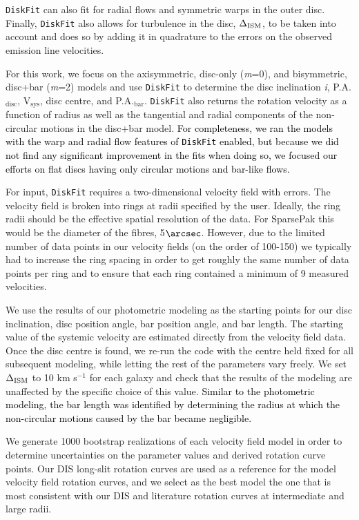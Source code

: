 \documentclass[a4paper,fleqn,usenatbib]{mnras}
\newcommand{\authorfix}{\textcolor{black}}
\begin{document}
\texttt{DiskFit} can also fit for radial flows and symmetric warps in the outer disc. Finally, \texttt{DiskFit} also allows for turbulence in the disc, $\Delta_{\rm ISM}$, to be taken into account and does so by adding it in quadrature to the errors on the observed emission line velocities.

For this work, we focus on the axisymmetric, disc-only (\textit{m}=0), and bisymmetric, disc+bar (\textit{m}=2) models and use \texttt{DiskFit} to determine the disc inclination \textit{i}, P.A.$_{\mathrm{disc}}$, V$_{\mathrm{sys}}$, disc centre, and P.A.$_{\mathrm{bar}}$. \texttt{DiskFit} also returns the rotation velocity as a function of radius as well as the tangential and radial components of the non-circular motions in the disc+bar model. \authorfix{For completeness, we ran the models with the warp and radial flow features of \texttt{DiskFit} enabled, but because we did not find any significant improvement in the fits when doing so, we focused our efforts on flat discs having only circular motions and bar-like flows.}

For input, \texttt{DiskFit} requires a two-dimensional velocity field with errors. The velocity field is broken into rings at radii specified by the user. Ideally, the ring radii should be the effective spatial resolution of the data. For SparsePak this would be the diameter of the fibres, 5$\arcsec$. However, due to the limited number of data points in our velocity fields (on the order of 100-150) we typically had to increase the ring spacing in order to get roughly the same number of data points per ring and to ensure that each ring contained a minimum of 9 measured velocities.

We use the results of our photometric modeling as the starting points for our disc inclination, disc position angle, bar position angle, and bar length. The starting value of the systemic velocity are estimated directly from the velocity field data. Once the disc centre is found, we re-run the code with the centre held fixed for all subsequent modeling, while letting the rest of the parameters vary freely. We set $\Delta_{\rm ISM}$ to 10 km s$^{-1}$ for each galaxy and check that the results of the modeling are unaffected by the specific choice of this value. \authorfix{Similar to the photometric modeling, the bar length was identified by determining the radius at which the non-circular motions caused by the bar became negligible.}

We generate 1000 bootstrap realizations of each velocity field model in order to determine uncertainties on the parameter values and derived rotation curve points. Our DIS long-slit rotation curves are used as a reference for the model velocity field rotation curves, and we select as the best model the one that is most consistent with our DIS and literature rotation curves at intermediate and large radii. 
\end{document}

